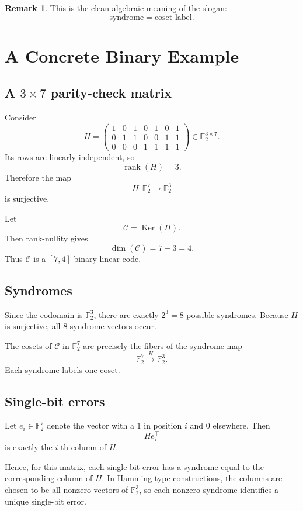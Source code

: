 \documentclass[11pt]{article}
\newcommand{\F}{\mathbb{F}}
\newcommand{\rank}{\operatorname{rank}}
\newcommand{\Ker}{\operatorname{Ker}}
\newcommand{\cC}{\mathcal{C}}
\theoremstyle{definition}
\newtheorem{remark}[definition]{Remark}
\theoremstyle{plain}
\begin{document}
	\begin{remark}
		This is the clean algebraic meaning of the slogan:
		\[
		\text{syndrome} = \text{coset label}.
		\]
	\end{remark}
	
	\section{A Concrete Binary Example}
	
	\subsection{A \(3\times 7\) parity-check matrix}
	
	Consider
	\[
	H=
	\begin{pmatrix}
		1&0&1&0&1&0&1\\
		0&1&1&0&0&1&1\\
		0&0&0&1&1&1&1
	\end{pmatrix}
	\in \F_2^{3\times 7}.
	\]
	Its rows are linearly independent, so
	\[
	\rank(H)=3.
	\]
	Therefore the map
	\[
	H:\F_2^7\to \F_2^3
	\]
	is surjective.
	
	Let
	\[
	\cC=\Ker(H).
	\]
	Then rank-nullity gives
	\[
	\dim(\cC)=7-3=4.
	\]
	Thus \(\cC\) is a \([7,4]\) binary linear code.
	
	\subsection{Syndromes}
	
	Since the codomain is \(\F_2^3\), there are exactly \(2^3=8\) possible syndromes. Because \(H\) is surjective, all \(8\) syndrome vectors occur.
	
	The cosets of \(\cC\) in \(\F_2^7\) are precisely the fibers of the syndrome map
	\[
	\F_2^7 \xrightarrow{\,H\,} \F_2^3.
	\]
	Each syndrome labels one coset.
	
	\subsection{Single-bit errors}
	
	Let \(e_i\in \F_2^7\) denote the vector with a \(1\) in position \(i\) and \(0\) elsewhere. Then
	\[
	He_i^\top
	\]
	is exactly the \(i\)-th column of \(H\).
	
	Hence, for this matrix, each single-bit error has a syndrome equal to the corresponding column of \(H\). In Hamming-type constructions, the columns are chosen to be all nonzero vectors of \(\F_2^3\), so each nonzero syndrome identifies a unique single-bit error.
	
\end{document}

